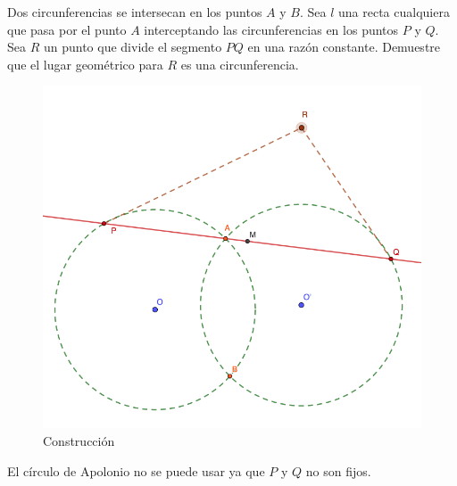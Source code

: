 





\begin{problema}
	Dos circunferencias se intersecan en los puntos $A$ y $B$. Sea $l$ una recta cualquiera que pasa por el punto $A$ interceptando  las circunferencias en los puntos $P$ y $Q$. Sea $R$ un punto que divide el segmento $PQ$ en una razón constante.  Demuestre que el lugar geométrico para $R$ es una circunferencia.
	\begin{figure}[H]
		\centering
		\includegraphics[scale=0.3]{Images/1}
		\caption{Construcción}
	\end{figure}
\end{problema}
\begin{cajita}
	El círculo de Apolonio no se puede usar ya que $P$ y $Q$ no son fijos. \end{cajita}
